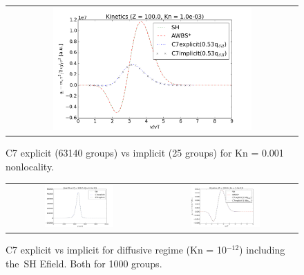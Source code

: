 \documentclass[preprint,12pt]{elsarticle}
\begin{document}
\begin{figure}[tbh]
  \begin{center}
    \begin{tabular}{c}
      \includegraphics[width=0.7\textwidth]{../results/fe_analysis/figs/P5_kinetics_niZ100_Kn1e-3_implexpl.png} 
    \end{tabular}
  \caption{
  C7 explicit (63140 groups) vs implicit (25 groups) for Kn = 0.001 nonlocality.
  }
  \end{center}
  \label{fig:C7explimpl}
\end{figure}

\begin{figure}[tbh]
  \begin{center}
    \begin{tabular}{cc}
        \includegraphics[width=0.5\textwidth]{../results/fe_analysis/figs/P5_heatfluxes_niZ100_Kn1e-12_implexpl.png} &
      \includegraphics[width=0.5\textwidth]{../results/fe_analysis/figs/P5_kinetics_niZ100_Kn1e-12_implexpl.png}          
    \end{tabular}
  \caption{
  C7 explicit vs implicit for diffusive regime (Kn = 10$^{-12}$) 
  including the~SH Efield. Both for 1000 groups.
  }
  \end{center}
  \label{fig:C7explimpl}
\end{figure}
\end{document}
